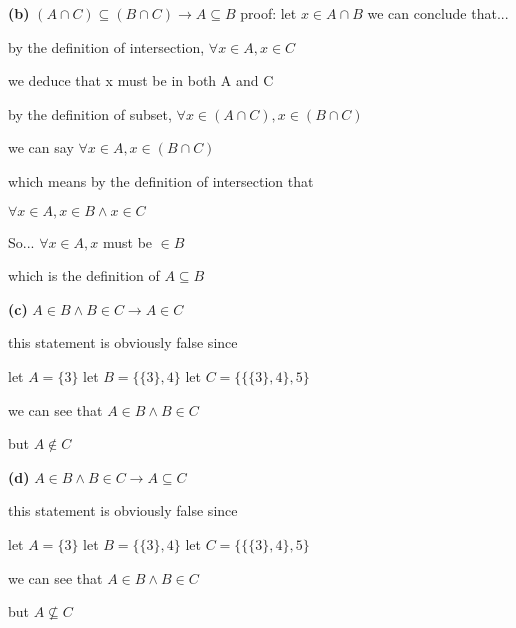 \documentclass[12pts,A4]{article}
\begin{document}
\begin{flushleft}
    \textbf{(b)} $(A \cap C ) \subseteq (B \cap C) \rightarrow A \subseteq B$
    proof:
    \bigskip
    let $x \in A \cap B$
    we can conclude that... 
    \bigskip
    
    by the definition of intersection, $\forall x \in A, x \in C$
    
    we deduce that x must be in both A and C 

    \bigskip
    by the definition of subset, $\forall x \in (A \cap C), x \in (B \cap C)$

    
    we can say $\forall x \in A, x \in (B \cap C)$

    \bigskip
    which means by the definition of intersection that 

    $\forall x \in A, x \in B \wedge x\in C$

    So... $\forall x \in A, x$ must be $\in B$

    which is the definition of $ A \subseteq B $





\end{flushleft}


\begin{flushleft}
   \textbf{(c)} $A \in B \wedge B \in C \rightarrow A \in C$ 
    
    this statement is obviously false since

    let $ A = \{ 3 \}$
    let $ B = \{ \{ 3 \}, 4 \}$
    let $ C = \{ \{ \{ 3 \}, 4 \}, 5 \}$

    \bigskip

    we can see that $A \in B \wedge B \in C$

    but $A \not\in C$



\end{flushleft}


\begin{flushleft}
   \textbf{(d)} $A \in B \wedge B \in C \rightarrow A \subseteq C$ 
    
    this statement is obviously false since

    let $ A = \{ 3 \}$
    let $ B = \{ \{ 3 \}, 4 \}$
    let $ C = \{ \{ \{ 3 \}, 4 \}, 5 \}$

    \bigskip

    we can see that $A \in B \wedge B \in C$

    but $A \not\subseteq C$



\end{flushleft}
\end{document}
